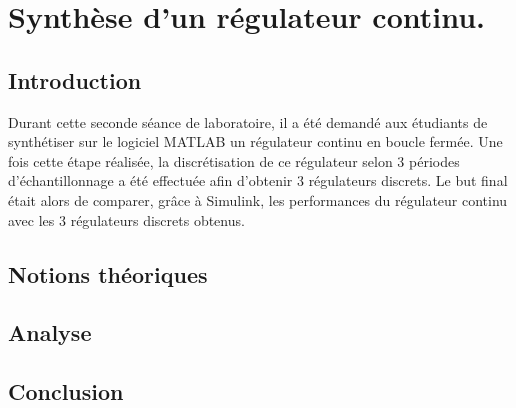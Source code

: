 \chapter{Synthèse d'un régulateur continu.}

\section{Introduction}
Durant cette seconde séance de laboratoire, il a été demandé aux étudiants de synthétiser sur le logiciel MATLAB un régulateur continu en boucle fermée. Une fois cette étape réalisée, la discrétisation de ce régulateur selon 3 périodes d'échantillonnage a été effectuée afin d'obtenir 3 régulateurs discrets. Le but final était alors de comparer, grâce à Simulink, les performances du régulateur continu avec les 3 régulateurs discrets obtenus. 


\section{Notions théoriques}


\section{Analyse}


\section{Conclusion}

